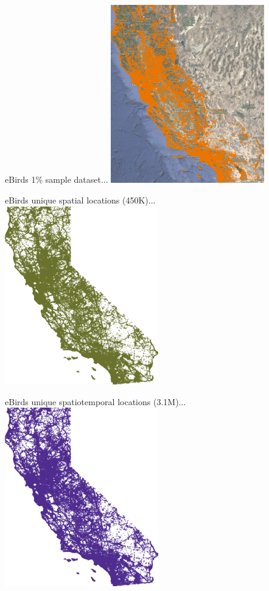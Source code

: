 \documentclass{beamer}
\begin{document}
\begin{frame}{eBirds 1\% sample dataset...}
    \centering
    \includegraphics[width=0.5\textwidth]{figures/ebirds_sample_1perc}
\end{frame}
\begin{frame}{eBirds unique spatial locations (450K)...}
    \centering
    \includegraphics[width=0.5\textwidth]{figures/ebirds_unique_spatial_location}
\end{frame}
\begin{frame}{eBirds unique spatiotemporal locations (3.1M)...}
    \centering
    \includegraphics[width=0.5\textwidth]{figures/ebirds_unique_spatiotemporal_location}
\end{frame}
\end{document}
